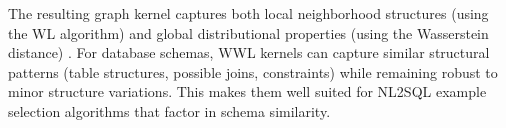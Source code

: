 The resulting graph kernel captures both local neighborhood structures (using
the WL algorithm) and global distributional properties (using the Wasserstein
distance) \citep{WWL}. For database schemas, WWL kernels can capture similar structural
patterns (table structures, possible joins, constraints) while remaining robust
to minor structure variations. This makes them well suited for NL2SQL example
selection algorithms that factor in schema similarity.

